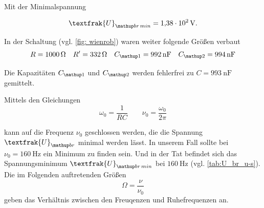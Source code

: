 Mit der Minimalspannung

\begin{equation*}
\textfrak{U}\ua{br\,min}=\SI{1.38e2}{\volt}.
\end{equation*}

In der Schaltung (vgl. \ref{fig: wienrob}) waren weiter folgende Größen verbaut
\begin{equation*}
R=\SI{1000}{\ohm} \quad R'=\SI{332}{\ohm} \quad C\ua{1}=\SI{992}{\nano\farad} \quad C\ua{2}=\SI{994}{\nano\farad}
\end{equation*}

Die Kapazitäten $C\ua{1}$ und $C\ua{2}$ werden fehlerfrei zu $C=\SI{993}{\nano\farad}$ gemittelt.

Mittels den Gleichungen
\begin{equation*}
\omega_{0}=\frac{1}{RC} \qquad \nu_{0}=\frac{\omega_0}{2\pi}
\end{equation*}

kann auf die Frequenz $\nu_{0}$ geschlossen werden, die die %
Spannung $\textfrak{U}\ua{br}$ minimal werden lässt.
In unserem Fall sollte bei $\nu_{0}=\SI{160}{\hertz}$ ein Minimum zu finden sein.
Und in der Tat befindet sich das Spannungsminimum $\textfrak{U}\ua{br\,min}$
bei $\SI{160}{\hertz}$ (vgl. \ref{tab:U_br_u-s}).
Die im Folgenden auftretenden Größen %
\begin{equation*}
\Omega=\frac{\nu}{\nu_0}
\end{equation*}
geben das Verhältnis zwischen den Freuqenzen und Ruhefrequenzen an. %

